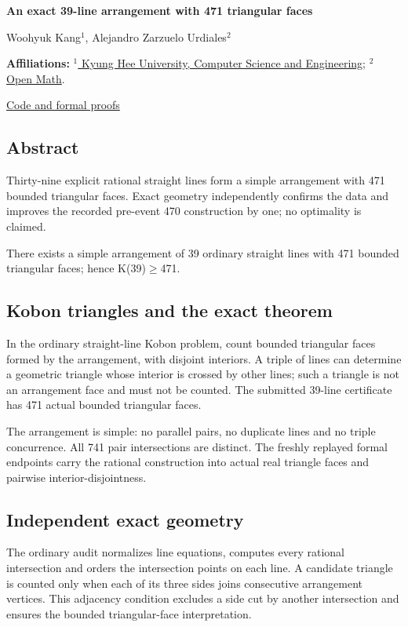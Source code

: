 \documentclass[11pt,a4paper]{article}
\begin{document}
{\LARGE\bfseries An exact 39-line arrangement with 471 triangular faces\par}\medskip
{\small Woohyuk Kang\ensuremath{^1}, Alejandro Zarzuelo Urdiales\ensuremath{^2}\par}\medskip
{\small\textbf{Affiliations:} \href{https://www.kyunghee.edu/eng/user/main/view.do}{\ensuremath{^1} Kyung Hee University, Computer Science and Engineering}; \href{https://rsihouse.ai/openmath}{\ensuremath{^2} Open Math}.\par}

{\small\href{https://github.com/alejandrozu/openmath-2026-judging}{Code and formal proofs}\par}

\subsection{Abstract}
Thirty-nine explicit rational straight lines form a simple arrangement with 471 bounded triangular faces. Exact geometry independently confirms the data and improves the recorded pre-event 470 construction by one; no optimality is claimed.

There exists a simple arrangement of 39 ordinary straight lines with 471 bounded triangular faces; hence K(39)\ensuremath{\geq}471.

\subsection{Kobon triangles and the exact theorem}
In the ordinary straight-line Kobon problem, count bounded triangular faces formed by the arrangement, with disjoint interiors. A triple of lines can determine a geometric triangle whose interior is crossed by other lines; such a triangle is not an arrangement face and must not be counted. The submitted 39-line certificate has 471 actual bounded triangular faces.

The arrangement is simple: no parallel pairs, no duplicate lines and no triple concurrence. All 741 pair intersections are distinct. The freshly replayed formal endpoints carry the rational construction into actual real triangle faces and pairwise interior-disjointness.

\subsection{Independent exact geometry}
The ordinary audit normalizes line equations, computes every rational intersection and orders the intersection points on each line. A candidate triangle is counted only when each of its three sides joins consecutive arrangement vertices. This adjacency condition excludes a side cut by another intersection and ensures the bounded triangular-face interpretation.
\end{document}
